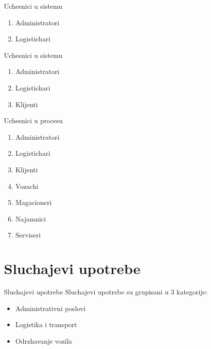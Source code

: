 \documentclass[11pt]{beamer}
\begin{document}
\begin{frame}{Uchesnici u sistemu}
    
    \begin{enumerate}
        \item Administratori
        \item Logistichari
    \end{enumerate}
\end{frame}
\begin{frame}{Uchesnici u sistemu}
    
    \begin{enumerate}
        \item Administratori
        \item Logistichari
        \bigskip
        \item Klijenti
    \end{enumerate}
\end{frame}
\begin{frame}{Uchesnici u procesu}
    
    \begin{enumerate}
        \item Administratori
        \item Logistichari
        \bigskip
        \item Klijenti
        \bigskip
        \item Vozachi
        \item Magacioneri
        \item Najamnici
        \item Serviseri
    \end{enumerate}
\end{frame}

\section{Sluchajevi upotrebe}

\begin{frame}{Sluchajevi upotrebe}
    Sluchajevi upotrebe su grupisani u 3 kategorije:
    
    \begin{itemize}
        \item Administrativni poslovi
        \item Logistika i transport
        \item Odrzhavanje vozila
    \end{itemize}
    
\end{frame}
\end{document}
